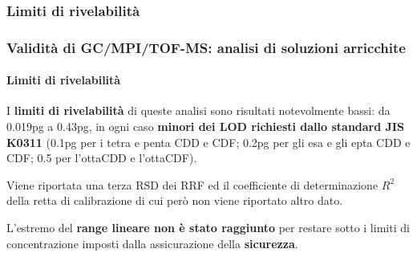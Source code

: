
\subsubsection{Limiti di rivelabilità}\begin{frame}\frametitle{Validità di GC/MPI/TOF-MS: analisi di soluzioni arricchite}\framesubtitle{Limiti di rivelabilità}

I {\bf limiti di rivelabilità} di queste analisi sono risultati notevolmente bassi: \pause 
da 0.019pg a 0.43pg, in ogni caso {\bf minori dei LOD richiesti dallo standard JIS K0311} (0.1pg per i tetra e penta CDD e CDF; 0.2pg per gli esa e gli epta CDD e CDF; 0.5 per l'ottaCDD e l'ottaCDF).
\pause

Viene riportata una terza RSD dei RRF ed il coefficiente di determinazione $R^2$ della retta di calibrazione di cui però non viene riportato altro dato.

L'estremo del {\bf range lineare non è stato raggiunto} per restare sotto i limiti di concentrazione imposti dalla assicurazione della {\bf sicurezza}.

\end{frame}
